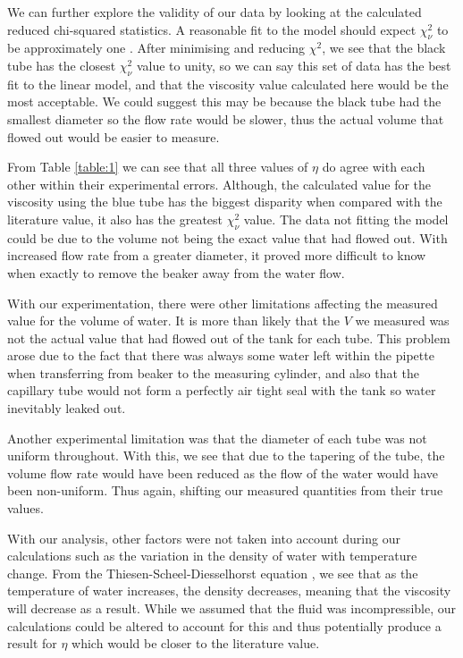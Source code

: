 \documentclass[twocolumn]{revtex4}
\begin{document}
We can further explore the validity of our data by looking at the calculated reduced chi-squared statistics. A reasonable fit to the model should expect $\chi^2_{\nu}$ to be approximately one \cite{hughesandhayes}. After minimising and reducing $\chi^2$, we see that the black tube has the closest $\chi^2_{\nu}$ value to unity, so we can say this set of data has the best fit to the linear model, and that the viscosity value calculated here would be the most acceptable. We could suggest this may be because the black tube had the smallest diameter so the flow rate would be slower, thus the actual volume that flowed out would be easier to measure.

From Table \ref{table:1} we can see that all three values of $\eta$ do agree with each other within their experimental errors. Although, the calculated value for the viscosity using the blue tube has the biggest disparity when compared with the literature value, it also has the greatest $\chi^2_{\nu}$ value. The data not fitting the model could be due to the volume not being the exact value that had flowed out. With increased flow rate from a greater diameter, it proved more difficult to know when exactly to remove the beaker away from the water flow. 

With our experimentation, there were other limitations affecting the measured value for the volume of water. It is more than likely that the $V$ we measured was not the actual value that had flowed out of the tank for each tube. This problem arose due to the fact that there was always some water left within the pipette when transferring from beaker to the measuring cylinder, and also that the capillary tube would not form a perfectly air tight seal with the tank so water inevitably leaked out.

Another experimental limitation was that the diameter of each tube was not uniform throughout. With this, we see that due to the tapering of the tube, the volume flow rate would have been reduced as the flow of the water would have been non-uniform. Thus again, shifting our measured quantities from their true values.

With our analysis, other factors were not taken into account during our calculations such as the variation in the density of water with temperature change. From the Thiesen-Scheel-Diesselhorst equation \cite{dentemp}, we see that as the temperature of water increases, the density decreases, meaning that the viscosity will decrease as a result. While we assumed that the fluid was incompressible, our calculations could be altered to account for this and thus potentially produce a result for $\eta$ which would be closer to the literature value.
\end{document}
